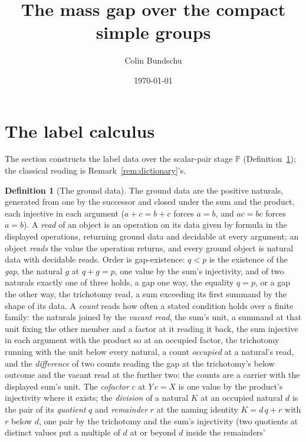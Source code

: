 \documentclass[11pt]{article}
\title{\textbf{The mass gap over the compact simple groups}}
\date{\today}
\author[1]{Colin Bundschu}
\affil[1]{University of California, Berkeley}
\theoremstyle{definition}
\newtheorem{definition}{Definition}
\begin{document}
\maketitle

\section{The label calculus}

The section constructs the label data over the scalar-pair stage
$\mathbb P$ (Definition~\ref{def:ground}); the classical
reading is Remark~\ref{rem:dictionary}'s.

\begin{definition}[The ground data]\label{def:ground}
The ground data are the positive naturals, generated from one by
the successor and closed under the sum and the product, each
injective in each argument ($a+c=b+c$ forces $a=b$, and $ac=bc$
forces $a=b$). A \emph{read} of an object is an operation on its
data given by formula in the displayed operations, returning
ground data and decidable at every argument; an object
\emph{reads} the value the operation returns, and every ground
object is natural data with decidable reads. Order is
gap-existence: $q<p$ is the existence of
the \emph{gap}, the natural $g$ at $q+g=p$, one value by the sum's
injectivity, and of two naturals exactly one of three holds, a gap
one way, the equality $q=p$, or a gap the other way, the
trichotomy read, a sum exceeding its first summand by
the shape of its data. A \emph{count} reads how often a stated
condition holds over a finite family: the naturals joined by the
\emph{vacant read}, the sum's unit, a summand at that unit fixing
the other member and a factor at it reading it back, the sum
injective in each argument with the product so at an occupied
factor, the trichotomy running with the unit below every natural,
a count \emph{occupied} at a natural's read, and the
\emph{difference} of two counts reading the gap at the
trichotomy's below outcome and the vacant read at the further
two: the counts are a carrier with the displayed sum's unit. The \emph{cofactor} $c$
at $Y\,c=X$ is one
value by the product's injectivity where it exists; the
\emph{division} of a natural $K$ at an occupied natural $d$ is the
pair of its \emph{quotient} $q$ and \emph{remainder} $r$ at the
naming identity $K=d\,q+r$ with $r$ below $d$, one pair by the
trichotomy and the sum's injectivity (two quotients at distinct
values put a multiple of $d$ at or beyond $d$ inside the remainders'

\end{definition}
\end{document}
